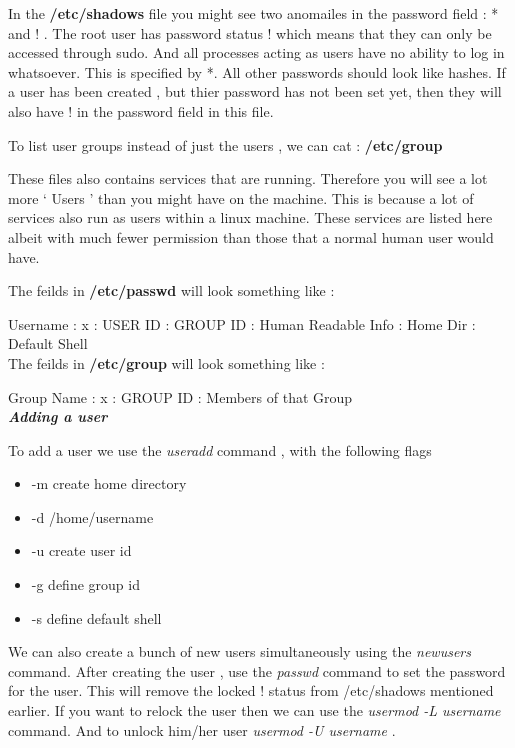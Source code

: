 \noindent
In the \textbf{/etc/shadows} file you might see two anomailes in the password
field : * and ! . The root user has password status ! which means that they can
only be accessed through sudo. And all processes acting as users have no ability
to log in whatsoever. This is specified by *. All other passwords should look
like hashes. If a user has been created , but thier password has not been set
yet, then they will also have ! in the password field in this file.

\noindent
To list user groups instead of just the users , we can cat : \textbf{/etc/group}

\noindent
These files also contains services that are running. Therefore you will see a lot
more ` Users ' than you might have on the machine. This is because a lot of
services also run as users within a linux machine. These services are listed
here albeit with much fewer permission than those that a normal human user would
have.

\noindent
The feilds in \textbf{/etc/passwd} will look something like :

\noindent
Username  :  x  :  USER ID  :  GROUP ID  :  Human Readable Info  :  Home Dir  :  Default Shell \\

\noindent
The feilds in \textbf{/etc/group} will look something like :

\noindent
Group Name  :  x  :  GROUP ID  :  Members of that Group \\

\noindent
\textbf{\textit{Adding a user}}

\noindent
To add a user we use the \textit{useradd} command , with the following flags


\begin{itemize}[noitemsep]


	\item -m create home directory
	\item -d /home/username
	\item -u create user id
	\item -g define group id
	\item -s define default shell


\end{itemize}


\noindent We can also create a bunch of new users simultaneously using the
\textit{newusers} command.  After creating the user , use the \textit{passwd}
command to set the password for the user. This will remove the locked ! status
from /etc/shadows mentioned earlier. If you want to relock the user then we can
use the \textit{usermod -L username} command. And to unlock him/her user
\textit{usermod -U username} .

